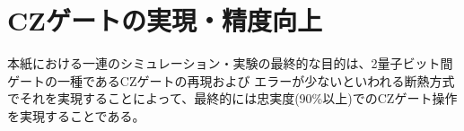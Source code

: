 \section{CZゲートの実現・精度向上}
    本紙における一連のシミュレーション・実験の最終的な目的は、2量子ビット間ゲートの一種であるCZゲートの再現および
    エラーが少ないといわれる断熱方式でそれを実現することによって、最終的には忠実度(90\%以上)でのCZゲート操作を実現することである。
